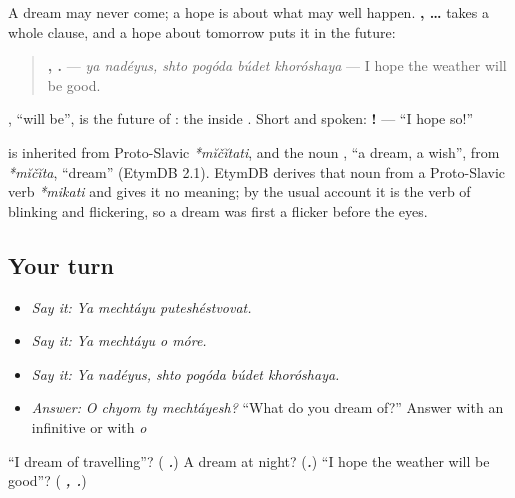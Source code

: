 \begin{grammarlens}[title={Grammar Lens: \ru{я} \ru{надеюсь}, \ru{что} …}]
A dream may never come; a hope is about what may well happen. \textbf{ ,  …} takes a whole clause, and a hope about tomorrow puts it in the future:

\begin{quote}
\textbf{ ,    .} — \emph{ya nadéyus, shto pogóda búdet khoróshaya} — I hope the weather will be good.
\end{quote}

\textbf{}, \textquotedblleft{}will be\textquotedblright{}, is the future of \emph{}: the \emph{} inside \emph{}. Short and spoken: \textbf{!} — \textquotedblleft{}I hope so!\textquotedblright{}
\end{grammarlens}

\begin{cousinweb}
\textbf{} is inherited from Proto-Slavic \emph{*mĭčĭtati}, and the noun \textbf{}, \textquotedblleft{}a dream, a wish\textquotedblright{}, from \emph{*mĭčĭta}, \textquotedblleft{}dream\textquotedblright{} (EtymDB 2.1). EtymDB derives that noun from a Proto-Slavic verb \emph{*mikati} and gives it no meaning; by the usual account it is the verb of blinking and flickering, so a dream was first a flicker before the eyes.
\end{cousinweb}

\subsection*{Your turn}
\begin{itemize}
\raggedright
  \item \emph{Say it:} \emph{Ya mechtáyu puteshéstvovat.}
  \item \emph{Say it:} \emph{Ya mechtáyu o móre.}
  \item \emph{Say it:} \emph{Ya nadéyus, shto pogóda búdet khoróshaya.}
  \item \emph{Answer:} \emph{O chyom ty mechtáyesh?} \textquotedblleft{}What do you dream of?\textquotedblright{} Answer with an infinitive or with \emph{o}
\end{itemize}

\begin{tcolorbox}[breakable,colback=teal!4,colframe=teal!35!black,title={Before you move on}]
\textquotedblleft{}I dream of travelling\textquotedblright{}? (\emph{\textbf{  .}}) A dream at night? (\emph{\textbf{.}}) \textquotedblleft{}I hope the weather will be good\textquotedblright{}? (\emph{\textbf{ ,    .}})
\end{tcolorbox}
